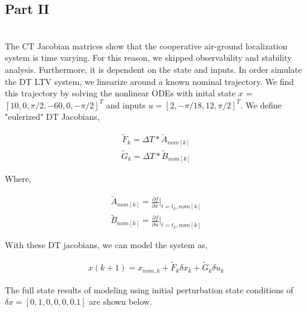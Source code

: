 \documentclass[paper=a4, fontsize=11pt]{scrartcl} %
\numberwithin{equation}{section} %
\numberwithin{figure}{section} %
\numberwithin{table}{section} %
\begin{document}
\begin{framed}
\subsection{Part II} \\

The CT Jacobian matrices show that the cooperative air-ground localization system is time varying. For this reason, we skipped observability and stability analysis. Furthermore, it is dependent on the state and inputs. In order simulate the DT LTV system, we linearize around a known nominal trajectory. We find this trajectory by solving the nonlinear ODEs with inital state \(x\) = \([10, 0, \pi/2, -60, 0, -\pi/2]^{T}\) and inputs \(u = [2, -\pi/18, 12, \pi/2]^{T}\). We define "eulerized" DT Jacobians,

\begin{align*}
    \tilde{F}_{k} = \Delta T * \tilde{A}_{nom[k]}
\end{align*}
\begin{align*}
    \tilde{G}_{k} = \Delta T * \tilde{B}_{nom[k]}
\end{align*}

Where,

\begin{align*}
    \tilde{A}_{nom[k]} = \frac{\partial f}{\partial x} \Big|_{t = t_{k}, nom[k]}
\end{align*}
\begin{align*}
    \tilde{B}_{nom[k]} = \frac{\partial f}{\partial u} \Big|_{t = t_{k}, nom[k]}
\end{align*}

With these DT jacobians, we can model the system as,

\begin{align*}
    x(k + 1) = x_{nom, k} + \tilde{F}_{k} \delta x_{k} + \tilde{G}_{k} \delta u_{k}
\end{align*}

The full state results of modeling using initial perturbation state conditions of \(\delta x = [0, 1, 0, 0, 0, 0.1]\) are shown below.


\end{framed}
\end{document}

